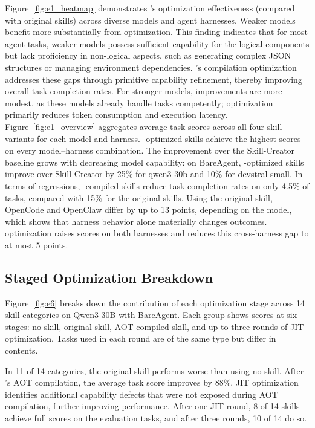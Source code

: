 Figure~\ref{fig:e1_heatmap} demonstrates \sys's optimization effectiveness (compared with original skills) across diverse models and agent harnesses.
Weaker models benefit more substantially from \sys optimization.
This finding indicates that for most agent tasks, weaker models possess sufficient capability for the logical components but lack proficiency in non-logical aspects, such as generating complex JSON structures or managing environment dependencies.
\sys's compilation optimization addresses these gaps through primitive capability refinement, 
thereby improving overall task completion rates.
For stronger models, improvements are more modest, as these models already handle tasks competently; 
\sys optimization primarily reduces token consumption and execution latency.
Figure~\ref{fig:e1_overview} aggregates average task scores across all four skill variants
for each model and harness.
\sys-optimized skills achieve the highest scores on every model--harness combination.
The improvement over the Skill-Creator baseline grows with decreasing model capability:
on BareAgent, \sys-optimized skills improve over Skill-Creator by 25\% for qwen3-30b and 10\% for devstral-small.
In terms of regressions, \sys-compiled skills reduce task completion rates on only 4.5\% of tasks, compared with 15\% for the original skills.
Using the original skill, OpenCode and OpenClaw differ by up to 13 points,
depending on the model, which shows that harness behavior alone materially changes outcomes.
\sys optimization raises scores on both harnesses and reduces this cross-harness gap to at most 5 points.


\subsection{Staged Optimization Breakdown}
\label{sec:eval:e6}

Figure~\ref{fig:e6} breaks down the contribution of each optimization stage
across 14 skill categories on Qwen3-30B with BareAgent.
Each group shows scores at six stages: no skill, original skill,
AOT-compiled skill, and up to three rounds of JIT optimization.
Tasks used in each round are of the same type but differ in contents.

In 11 of 14 categories, the original skill performs worse than using no skill.
After \sys's AOT compilation, the average task score improves by 88\%.
JIT optimization identifies additional capability defects that were not exposed during AOT compilation,
further improving performance.
After one JIT round, 8 of 14 skills achieve full scores on the
evaluation tasks, and after three rounds, 10 of 14 do so.

